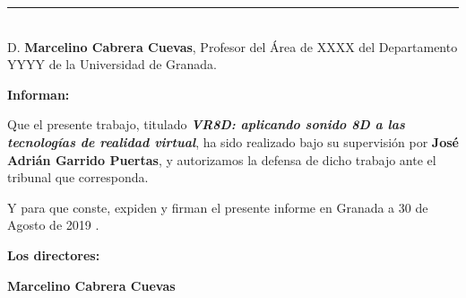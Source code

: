 \noindent\rule[-1ex]{\textwidth}{2pt}\\[4.5ex]

D. \textbf{Marcelino Cabrera Cuevas}, Profesor del Área de XXXX del Departamento YYYY de la Universidad de Granada.

\vspace{0.5cm}

\textbf{Informan:}

\vspace{0.5cm}

Que el presente trabajo, titulado \textit{\textbf{VR8D: aplicando sonido 8D a las tecnologías de realidad virtual}},
ha sido realizado bajo su supervisión por \textbf{José Adrián Garrido Puertas}, y autorizamos la defensa de dicho trabajo ante el tribunal que corresponda.

\vspace{0.5cm}

Y para que conste, expiden y firman el presente informe en Granada a 30 de Agosto de 2019 .

\vspace{1cm}

\textbf{Los directores:}

\vspace{5cm}

\noindent \textbf{Marcelino Cabrera Cuevas}

\newpage %
